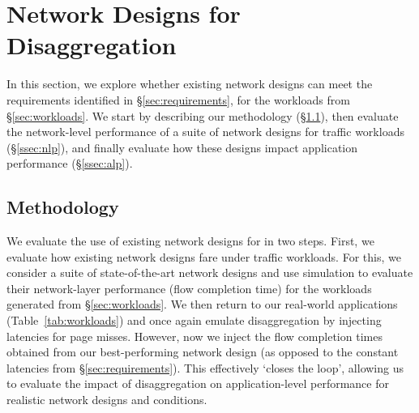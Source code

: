 \section{Network Designs for Disaggregation}
\label{sec:existing}

In this section, we explore whether existing network designs can meet the requirements identified in \S\ref{sec:requirements}, for the workloads from \S\ref{sec:workloads}. 
We start by describing our methodology (\S\ref{ssec:ssmethod}), then evaluate the network-level performance of a suite of network designs for \dis traffic workloads (\S\ref{ssec:nlp}), and finally 
evaluate how these designs impact application performance (\S\ref{ssec:alp}). 

%
\subsection{Methodology}
\label{ssec:ssmethod}

We evaluate the use of existing network designs for \dis in two steps.
First, we evaluate how existing network designs fare under \dis traffic workloads. 
For this, we consider a suite of state-of-the-art network designs and use simulation to evaluate their network-layer performance (flow completion time) for the workloads generated from \S\ref{sec:workloads}.
We then return to our real-world applications (Table~\ref{tab:workloads}) and once again 
emulate disaggregation by injecting latencies for page misses. 
However, now we inject the flow completion times obtained from our best-performing network design (as opposed to the constant latencies from \S\ref{sec:requirements}). 
This effectively `closes the loop', allowing us to evaluate the impact of disaggregation on 
application-level performance for realistic network designs and conditions. 

